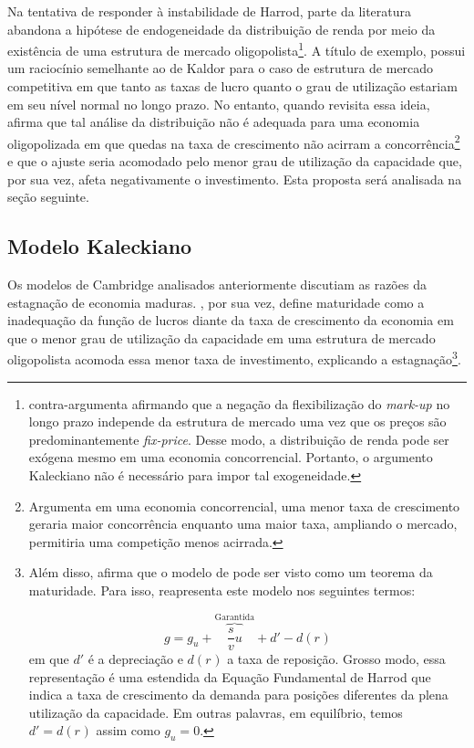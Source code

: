 Na tentativa de responder à instabilidade de Harrod, parte da literatura abandona a hipótese de endogeneidade da distribuição de renda por meio da existência de uma estrutura de mercado oligopolista\footnote{\textcite{serrano_sraffian_1995} contra-argumenta afirmando que a negação da flexibilização do \textit{mark-up} no longo prazo independe da estrutura de mercado uma vez que os preços são predominantemente \textit{fix-price}. Desse modo, a distribuição de renda pode ser exógena mesmo em uma economia concorrencial. Portanto, o argumento Kaleckiano não é necessário para impor tal exogeneidade.}. A título de exemplo, \textcite{steindl_maturity_1952} possui um raciocínio semelhante ao de Kaldor para o caso de estrutura de mercado competitiva em que tanto as taxas de lucro quanto o grau de utilização estariam em seu nível normal no longo prazo. No entanto, quando revisita essa ideia, afirma que tal análise da distribuição não é adequada para uma economia oligopolizada  em que quedas na taxa de crescimento não acirram a concorrência\footnote{Argumenta em uma economia concorrencial, uma menor taxa de crescimento geraria maior concorrência enquanto uma maior taxa, ampliando o mercado, permitiria uma competição menos acirrada.} e que o ajuste seria acomodado pelo menor grau de utilização da capacidade que, por sua vez, afeta negativamente o investimento. Esta proposta será analisada na seção seguinte.




\subsection{Modelo Kaleckiano}

Os modelos de Cambridge analisados anteriormente discutiam as razões da estagnação de economia maduras.
\textcite{steindl_stagnation_1979}, por sua vez, define maturidade como a inadequação da função de lucros diante da taxa de crescimento da economia em que o menor grau de utilização da capacidade em uma estrutura de mercado oligopolista acomoda essa menor taxa de investimento, explicando a estagnação\footnote{Além disso, afirma que o modelo de \textcite{harrod_essay_1939} pode ser visto como um teorema da maturidade. Para isso, reapresenta este modelo nos seguintes termos:

$$
g = g_u + \overbrace{\frac{s}{v}u}^{\text{Garantida}} + d' - d(r_{})
$$
em que $d'$ é a depreciação e $d(r_{})$ a taxa de reposição. Grosso modo, essa representação é uma estendida da Equação Fundamental de Harrod que indica a taxa de crescimento da demanda para posições diferentes da plena utilização da capacidade. Em outras palavras, em equilíbrio, temos $d' = d(r_{})$ assim como $g_u = 0$.}. 


